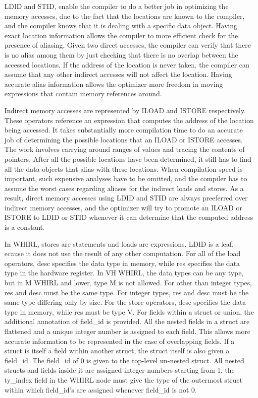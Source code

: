 \documentclass{article}
\begin{document}
%
LDID and
%
STID, enable the compiler to do a better
job in optimizing the memory accesses, due to the fact that the
locations are known to the compiler, and the compiler knows that
it is dealing with a specific data object. Having exact location
information allows the compiler to more efficient
check for the presence of aliasing. Given two direct
accesses, the compiler can verify that there is no alias among
them by just checking that there is no overlap between the accessed
locations. If the address of the location is never taken, the
compiler can assume that any other indirect accesses will not affect
the location. Having accurate alias information allows the optimizer
more freedom in moving expressions that contain memory references
around. 

Indirect memory accesses are represented by
%
ILOAD and
%
ISTORE
respectively. These operators reference an expression that computes
the address of the location being accessed. It takes substantially
more compilation time to do an accurate job of determining the
possible locations that an
%
ILOAD or
%
ISTORE accesses. The work
involves carrying around ranges of values and tracing the contents
of pointers. After all the possible locations have been determined,
it still has to find all the data objects that alias with these
locations. When compilation speed is important, such expensive
analyses have to be omitted, and the compiler has to assume the worst
cases regarding aliases for the indirect loads and stores. As a
result, direct memory accesses using
%
LDID and
%
STID are always
preeferred over indirect memory accesses, and the optimizer 
will try to promote an
%
ILOAD or
%
ISTORE to
%
LDID or
%
STID whenever it can
determine that the computed address is a constant.

In WHIRL, stores are statements and loads are expressions.
%
LDID is a
leaf, ecause it does not use the result of any other computation. For
all of the load operators, desc specifies the data type in memory,
while res specifies the data type in the hardware register. In VH
WHIRL, the data types can be any type, but in M WHIRL and lower,
type M is not allowed. For other than integer types, res and desc
must be the same type. For integer types, res and desc must be the
same type differing only by size. For the store operators, desc
specifies the data type in memory, while res must be type V. For
fields within a struct or union, the additional annotation of
field\_id is provided. All the nested fields in a struct are flattened
and a unique integer number is assigned to each field. This allows
more accurate information to be represented in the case of
overlapping fields. If a struct is itself a field within another
struct, the struct itself is also given a field\_id. The
field\_id of 0 is given to the top-level un-nested struct. All nested
structs and fields inside it are assigned integer numbers starting
from 1. the ty\_index field in the WHIRL node must give the type of
the outermost struct within which field\_id's are assigned whenever
field\_id is not 0.
\end{document}
